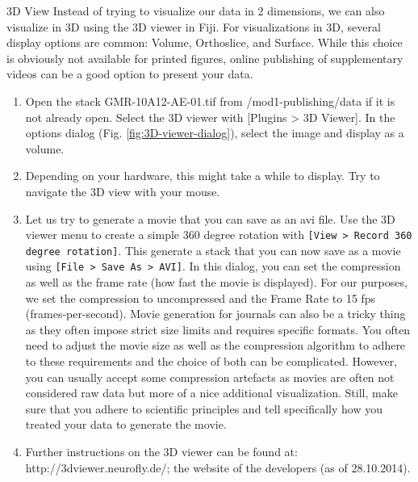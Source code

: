 \begin{taskbox}{3D View}
Instead of trying to visualize our data in 2 dimensions, we can also visualize in 3D using the 3D viewer in Fiji. For visualizations in 3D, several display options are common: Volume, Orthoslice, and Surface. While this choice is obviously not available for printed figures, online publishing of supplementary videos can be a good option to present your data.

\begin{enumerate}
	\item Open the stack GMR-10A12-AE-01.tif from /mod1-publishing/data if it is not already open. Select the 3D viewer with [Plugins > 3D Viewer]. In the options dialog (Fig. \ref{fig:3D-viewer-dialog}), select the image and display as a volume.	
	
	\begin{minipage}[t]{\linewidth}
		\begin{center}
		\medskip
		\label{fig:3D-viewer-dialog}
		\end{center}
	\end{minipage}
	
	\item Depending on your hardware, this might take a while to display. Try to navigate the 3D view with your mouse. 
	\item Let us try to generate a movie that you can save as an avi file. Use the 3D viewer menu to create a simple 360 degree rotation with \texttt{[View > Record 360 degree rotation]}. This generate a stack that you can now save as a movie using \texttt{[File > Save As > AVI]}. In this dialog, you can set the compression as well as the frame rate (how fast the movie is displayed). For our purposes, we set the compression to uncompressed and the Frame Rate to 15 fps (frames-per-second). Movie generation for journals can also be a tricky thing as they often impose strict size limits and requires specific formats. You often need to adjust the movie size as well as the compression algorithm to adhere to these requirements and the choice of both can be complicated. However, you can usually accept some compression artefacts as movies are often not considered raw data but more of a nice additional visualization. Still, make sure that you adhere to scientific principles and tell specifically how you treated your data to generate the movie.
	\item Further instructions on the 3D viewer can be found at: http://3dviewer.neurofly.de/; the website of the developers (as of 28.10.2014).
\end{enumerate}


\end{taskbox}
